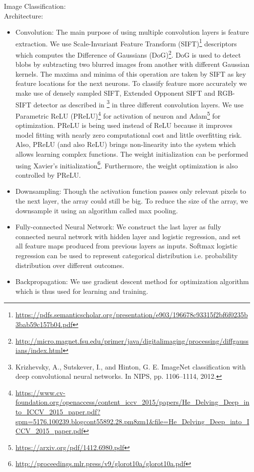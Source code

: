 \documentclass[8pt,a4]{article}
\begin{document}
\begin{itemize}
	Image Classification:
	\\Architecture:
	\begin{itemize}
		\item Convolution: The main purpose of using multiple convolution layers is feature extraction. We use Scale-Invariant Feature Transform (SIFT)\footnote{\url{https://pdfs.semanticscholar.org/presentation/e903/196678c93315f2bf6f0235b3bab59c157b04.pdf}} descriptors which computes the Difference of Gaussians (DoG)\footnote{\url{http://micro.magnet.fsu.edu/primer/java/digitalimaging/processing/diffgaussians/index.html}}. DoG is used to detect blobs by subtracting two blurred images from another with different Gaussian kernels. The maxima and minima of this operation are taken by SIFT as key feature locations for the next neurons. To classify feature more accurately we make use of densely sampled SIFT, Extended Opponent SIFT and RGB-SIFT detector as described in \footnote{Krizhevsky, A., Sutskever, I., and Hinton, G. E. ImageNet classification with deep convolutional neural networks. In NIPS, pp. 1106–1114, 2012.
		} in three different convolution layers. We use Parametric ReLU (PReLU)\footnote{\url{https://www.cv-foundation.org/openaccess/content_iccv_2015/papers/He_Delving_Deep_into_ICCV_2015_paper.pdf?spm=5176.100239.blogcont55892.28.pm8zm1&file=He_Delving_Deep_into_ICCV_2015_paper.pdf}} for activation of neuron and Adam\footnote{\url{https://arxiv.org/pdf/1412.6980.pdf}} for optimization. PReLU is being used instead of ReLU because it improves model fitting with nearly zero computational cost and little overfitting risk. Also, PReLU (and also ReLU) brings non-linearity into the system which allows learning complex functions. The weight initialization can be performed using Xavier's initialization\footnote{\url{http://proceedings.mlr.press/v9/glorot10a/glorot10a.pdf}}. Furthermore, the weight optimization is also controlled by PReLU.
		\item Downsampling:  Though the activation function passes only relevant pixels to the next layer, the array could still be big. To reduce the size of the array, we downsample it using an algorithm called max pooling.
		\item Fully-connected Neural Network: We construct the last layer as fully connected neural network with hidden layer and logistic regression, and set all feature maps produced from previous layers as inputs. Softmax logistic regression can be used to represent categorical distribution i.e. probability distribution over different outcomes.
		\item Backpropagation: We use gradient descent method for optimization algorithm which is thus used for learning and training.
	\end{itemize}
	

\end{itemize}
\end{document}
